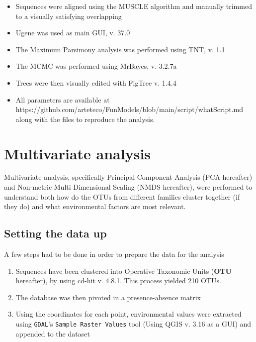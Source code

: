 \begin{itemize}
\item Sequences were aligned using the MUSCLE algorithm and manually trimmed to a visually satisfying overlapping

\item Ugene was used as main GUI, v. 37.0

\item The Maximum Parsimony analysis was performed using TNT, v. 1.1

\item The MCMC was performed using MrBayes, v. 3.2.7a

\item Trees were then visually edited with FigTree v. 1.4.4

\item All parameters are available at https:\slash \slash github.com\slash arteteco\slash FunModels\slash blob\slash main\slash script\slash whatScript.md along with the files to reproduce the analysis.

\end{itemize}

\section{Multivariate analysis}
\label{multivariateanalysis}

Multivariate analysis, specifically Principal Component Analysis (PCA hereafter) and Non-metric Multi Dimensional Scaling (NMDS hereafter), were performed to understand both how do the OTUs from different families cluster together (if they do) and what environmental factors are most relevant.

\subsection{Setting the data up}
\label{settingthedataup}

A few steps had to be done in order to prepare the data for the analysis

\begin{enumerate}
\item  Sequences have been clustered into Operative Taxonomic Units (\textbf{OTU} hereafter), by using cd-hit v. 4.8.1. This process yielded 210 OTUs.

\item  The database was then pivoted in a presence-absence matrix

\item  Using the coordinates for each point, environmental values were extracted using \texttt{GDAL}'s \texttt{Sample Raster Values} tool (Using QGIS v. 3.16 as a GUI) and appended to the dataset

\end{enumerate}

